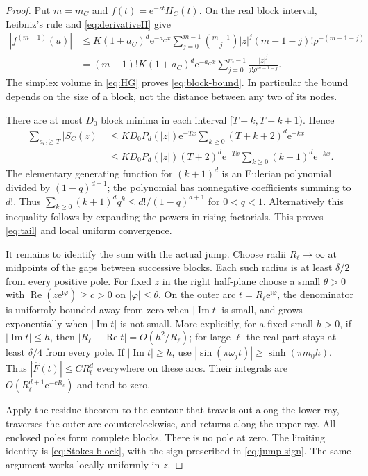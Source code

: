 \documentclass[11pt,a4paper]{article}
\numberwithin{equation}{section}
\theoremstyle{definition}
\theoremstyle{remark}
\newcommand{\ii}{\mathrm i}
\newcommand{\e}{\mathrm e}
\newcommand{\re}{\operatorname{Re}}
\newcommand{\im}{\operatorname{Im}}
\begin{document}
\begin{proof}
Put $m=m_C$ and $f(t)=\e^{-zt}H_C(t)$. On the real block interval,
Leibniz's rule and \eqref{eq:derivativeH} give
\begin{align*}
 |f^{(m-1)}(u)|
 &\le K(1+a_C)^d\e^{-a_Cx}
 \sum_{j=0}^{m-1}\binom{m-1}{j}|z|^j(m-1-j)!\rho^{-(m-1-j)}\\
 &=(m-1)!K(1+a_C)^d\e^{-a_Cx}
   \sum_{j=0}^{m-1}\frac{|z|^j}{j!\rho^{m-1-j}}.
\end{align*}
The simplex volume in \eqref{eq:HG} proves \eqref{eq:block-bound}.
In particular the bound depends on the size of a block, not the distance
between any two of its nodes.

There are at most $D_0$ block minima in each interval
$[T+k,T+k+1)$. Hence
\begin{align*}
 \sum_{a_C\ge T}|S_C(z)|
 &\le KD_0P_d(|z|)\e^{-Tx}
       \sum_{k\ge0}(T+k+2)^d\e^{-kx}\\
 &\le KD_0P_d(|z|)(T+2)^d\e^{-Tx}
       \sum_{k\ge0}(k+1)^d\e^{-kx}.
\end{align*}
The elementary generating function for $(k+1)^d$ is an Eulerian
polynomial divided by $(1-q)^{d+1}$; the polynomial has nonnegative
coefficients summing to $d!$. Thus
$\sum_{k\ge0}(k+1)^d q^k\le d!/(1-q)^{d+1}$ for $0<q<1$.
Alternatively this inequality follows by expanding the powers in rising
factorials. This proves \eqref{eq:tail} and local uniform convergence.

It remains to identify the sum with the actual jump. Choose radii $R_
\ell\to\infty$ at midpoints of the gaps between successive blocks.
Each such radius is at least $\delta/2$ from every positive pole.
For fixed $z$ in the right half-plane choose a small $\theta>0$ with
$\re(z\e^{\ii\varphi})\ge c>0$ on $|\varphi|\le\theta$.
On the outer arc $t=R_\ell\e^{\ii\varphi}$, the denominator is uniformly
bounded away from zero when $|\im t|$ is small, and grows exponentially
when $|\im t|$ is not small. More explicitly, for a fixed small $h>0$,
if $|\im t|\le h$, then
$|R_\ell-\re t|=O(h^2/R_\ell)$; for large $\ell$ the real part stays at
least $\delta/4$ from every pole. If $|\im t|\ge h$, use
$|\sin(\pi\omega_jt)|\ge\sinh(\pi m_0h)$.
Thus $|\widehat F(t)|\le C R_\ell^d$ everywhere on these arcs.
Their integrals are $O(R_\ell^{d+1}\e^{-cR_\ell})$ and tend to zero.

Apply the residue theorem to the contour that travels out along the lower
ray, traverses the outer arc counterclockwise, and returns along the upper
ray. All enclosed poles form complete blocks. There is no pole at zero.
The limiting identity is \eqref{eq:Stokes-block}, with the sign prescribed
in \eqref{eq:jump-sign}. The same argument works locally uniformly in $z$.
\end{proof}
\end{document}
